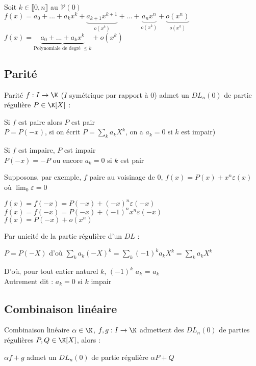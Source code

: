 \documentclass[12pt,a4paper]{report}
\begin{document}
\begin{demo}
Soit $k \in \llbracket 0, n \rrbracket$ au $\mathcal{V}(0)$\\
$f(x) = a_0 + ... + a_k x^k + \underbrace{a_{k+1} x^{k+1}}_{o(x^k)} + ... + \underbrace{a_{n} x^{n}}_{o(x^k)} + \underbrace{o(x^n)}_{o(x^k)}$\\
$f(x)=\underbrace{a_0 + ... + a_{k} x^{k}}_{\text{Polynomiale de degré } \leq k} + o(x^k)$
\end{demo}

\subsection{Parité}
\begin{proposition}{Parité}{}
$f:I\to \K$ ($I$ symétrique par rapport à 0) admet un $DL_n (0)$ de partie régulière $P\in \K[X]$ :
\begin{center}
    Si $f$ est paire alors $P$ est pair \\
    \ie $P=P(-x)$, si on écrit $P=\displaystyle\sum_k a_k X^k$, on a $a_k=0$ si $k$ est impair)\\
\end{center}
\begin{center}
    Si $f$ est impaire, $P$ est impair\\
    \ie $P(-x)=-P$ ou encore $a_k = 0$ si $k$ est pair
\end{center}
\end{proposition}

\begin{demo}
Supposons, par exemple, $f$ paire au voisinage de 0, $f(x)=P(x)+x^n \varepsilon(x)$ où $\displaystyle\lim_0 \varepsilon = 0$ 
\begin{center}
    $f(x)=f(-x)=P(-x)+(-x)^n \varepsilon (-x)$\\
    $f(x)=f(-x)=P(-x)+(-1)^n x^n \varepsilon (-x)$\\
    $f(x)= P(-x) + o(x^n)$
\end{center}
Par unicité de la partie régulière d'un $DL$ :
\begin{center}
    $P=P(-X)$ d'où $\displaystyle\sum_k a_k (-X)^k = \displaystyle\sum_k (-1)^k a_k X^k = \displaystyle\sum_k a_k X^k$
\end{center}
D'où, pour tout entier naturel $k$, $(-1)^k$ $a_k$ = $a_k$\\
Autrement dit : $a_k=0$ si $k$ impair
\end{demo}

\subsection{Combinaison linéaire}
\begin{proposition}{Combinaison linéaire}{}
$\alpha \in \K$, $f,g:I\to \K$ admettent des $DL_n (0)$ de parties régulières $P,Q \in \K[X]$, alors :
\begin{center}
    $\alpha f + g$ admet un $DL_n (0)$ de partie régulière $\alpha P + Q$
\end{center}
\end{proposition}
\end{document}
